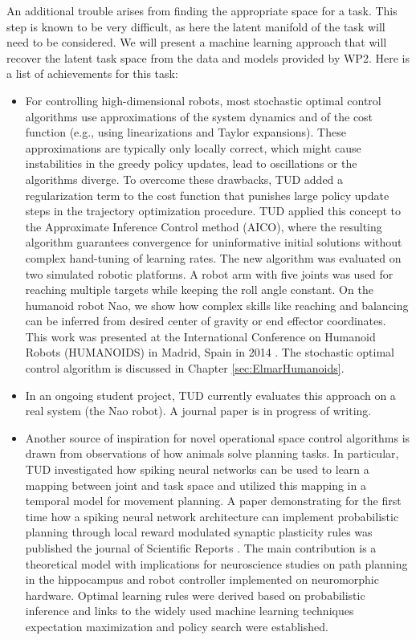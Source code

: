 \documentclass[12pt,a4paper,twoside]{report}
\begin{document}
An additional trouble arises from finding the appropriate space for a task. This step is known to be very
difficult, as here the latent manifold of the task will need to be considered. We will present a machine
learning approach that will recover the latent task space from the data and models provided by WP2. 
Here is a list of achievements for this task:
\begin{itemize}

\item For controlling high-dimensional robots, most stochastic optimal 
control algorithms use approximations of the system dynamics and of the cost function (e.g.,
using linearizations and Taylor expansions). These approximations are typically only locally
correct, which might cause instabilities in the greedy policy updates, lead to oscillations or the
algorithms diverge. To overcome these drawbacks, TUD added a regularization term to the
cost function that punishes large policy update steps in the trajectory optimization procedure.
TUD applied this concept to the Approximate Inference Control method (AICO), where the
resulting algorithm guarantees convergence for uninformative initial solutions without complex
hand-tuning of learning rates. The new algorithm was evaluated on two simulated robotic platforms. A robot arm with
 five joints was used for reaching multiple targets while keeping the roll angle constant. On the
humanoid robot Nao, we show how complex skills like reaching and balancing 
can be inferred from desired center of gravity or end effector coordinates. This work was
presented at the International Conference on Humanoid Robots (HUMANOIDS) in Madrid, Spain in 2014 \cite{AICOHumanoidsFinal}. The stochastic optimal 
control algorithm is discussed in Chapter \ref{sec:ElmarHumanoids}. 

\item In an ongoing student project, TUD currently evaluates this approach on a real system (the Nao robot). A journal paper is in progress of writing. 

\item Another source of inspiration for novel operational space control algorithms is drawn from observations of how animals solve planning tasks. 
In particular, TUD investigated how spiking neural networks can be used to learn 
a mapping between joint and task space and utilized this mapping in a temporal model for movement planning. 
A paper demonstrating for the first time how a spiking neural network architecture can
implement probabilistic planning through local reward modulated synaptic plasticity rules was published the journal of Scientific Reports \cite{Rueckert_SR_2016}. 
The main contribution is a theoretical model with implications for neuroscience studies on path
planning in the hippocampus and robot controller implemented on neuromorphic hardware.
Optimal learning rules were derived based on probabilistic inference and links to the widely
used machine learning techniques expectation maximization and policy search were 
established. 


\end{itemize}
\end{document}
